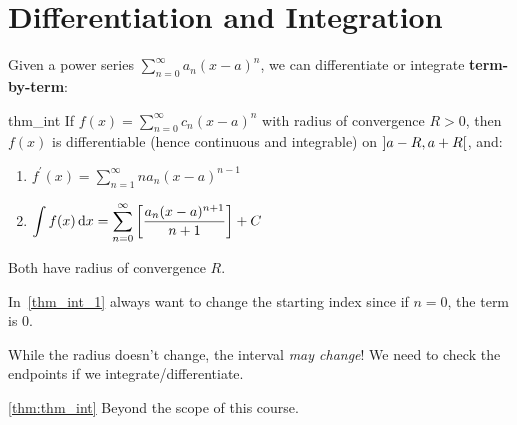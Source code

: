 \section{Differentiation and Integration}
Given a power series $ \sum\limits_{n=0}^{\infty} a_n(x-a)^n $,
we can differentiate or integrate \textbf{term-by-term}:
\begin{Theorem}{}{thm_int}
    If $ f(x)=\sum\limits_{n=0}^{\infty} c_n(x-a)^n $ with radius of convergence
    $ R>0 $, then $ f(x) $ is differentiable (hence continuous and integrable)
    on $ \interval[open]{a-R}{a+R} $, and:
    \begin{enumerate}[label=(\arabic*)]
        \item\label{thm_int_1} $ \displaystyle f^\prime(x)=\sum\limits_{n=1}^{\infty} n a_n(x-a)^{n-1} $
        \item\label{thm_int_2} $ \displaystyle\int f(x)\odif{x} =\sum\limits_{n=0}^{\infty} \left[
                      \frac{a_n(x-a)^{n+1}}{n+1}
                      \right]+C $
    \end{enumerate}
    Both have radius of convergence $ R $.
\end{Theorem}

\begin{Remark}{}{}
    In~\ref{thm_int_1} always want to change the starting index since if $ n=0 $, the term is $ 0 $.
\end{Remark}

\begin{Remark}{}{}
    While the radius doesn't change, the interval \emph{may change}! We need to check the endpoints
    if we integrate/differentiate.
\end{Remark}

\begin{Proof}{\ref{thm:thm_int}}{}
    Beyond the scope of this course.
\end{Proof}

